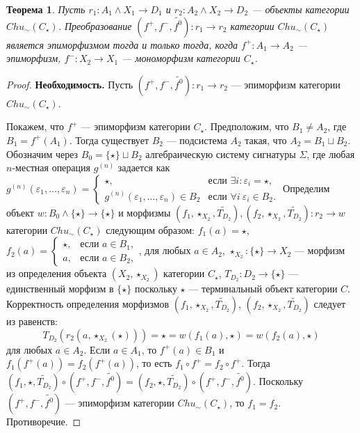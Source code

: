 \documentclass[a4paper,12pt]{article}
\newtheorem{theorem}{Теорема}
\newcommand{\fo}{\widetilde{f^0}}
\begin{document}
\begin{theorem}\label{epimorphism-c}
    Пусть $r_1: A_1 \wedge X_1 \to D_1$ и $r_2: A_2 \wedge X_2 \to D_2$ --- объекты категории $Chu_\sim(C_\star)$. Преобразование $(f^+,f^-,\fo): r_1 \to r_2$ категории $Chu_\sim(C_\star)$ является эпиморфизмом тогда и только тогда, когда $f^+: A_1 \to A_2$ --- эпиморфизм, $f^-: X_2 \to X_1$ --- мономорфизм категории $C_{\star}$.
\end{theorem}
\begin{proof}
    \textbf{Необходимость.} Пусть $(f^+,f^-,\fo): r_1 \to r_2$ --- эпиморфизм категории $Chu_\sim(C_\star)$.

    Покажем, что $f^+$ --- эпиморфизм категории $C_\star$. Предположим, что $B_1 \ne A_2$, где $B_1 = f^+(A_1)$. Тогда существует $B_2$ --- подсистема $A_2$ такая, что $A_2 = B_1 \sqcup B_2$. Обозначим через $B_0 = \{\star\} \sqcup B_2$ алгебраическую систему сигнатуры $\Sigma$, где любая $n$-местная операция $g^{(n)}$ задается как $g^{(n)}(\varepsilon_1,\ldots,\varepsilon_n) = 
    \begin{cases}
        \star, & \text{если } \exists i: \varepsilon_i = \star,\\
        g^{(n)}(\varepsilon_1,\ldots,\varepsilon_n) \in B_2 & \text{если } \forall i\ \varepsilon_i \in B_2.
    \end{cases}$ Определим объект $w: B_0 \wedge \{\star\} \to \{\star\}$ и морфизмы $(f_1,\star_{X_2},\widetilde{T_{D_2}}), (f_2,\star_{X_2},\widetilde{T_{D_2}}): r_2 \to w$ категории $Chu_\sim(C_\star)$ следующим образом: $f_1(a) = \star$, $f_2(a) = 
    \begin{cases}
        \star, & \text{если } a \in B_1,\\
        a, & \text{если } a \in B_2,
    \end{cases}$, для любых $a \in A_2$, $\star_{X_2}: \{\star\} \to X_2$ --- морфизм из определения объекта $(X_2,\star_{X_2})$ категории $C_\star$, $T_{D_2}: D_2 \to \{\star\}$ --- единственный морфизм в $\{\star\}$ поскольку $\star$ --- терминальный объект категории $C$. Корректность определения морфизмов $(f_1,\star_{X_2},\widetilde{T_{D_2}})$, $(f_2,\star_{X_2},\widetilde{T_{D_2}})$ следует из равенств:
    $$
        T_{D_2}(r_2(a,\star_{X_2}(\star))) = \star = w(f_1(a),\star) = w(f_2(a),\star)
    $$
    для любых $a \in A_2$. Если $a \in A_1$, то $f^+(a) \in B_1$ и $f_1(f^+(a)) = f_2(f^+(a))$, то есть $f_1 \circ f^+ = f_2 \circ f^+$. Тогда $(f_1,\star,\widetilde{T_{D_2}}) \circ (f^+,f^-,\fo) = (f_2,\star,\widetilde{T_{D_2}}) \circ (f^+,f^-,\fo)$. Поскольку $(f^+,f^-,\fo)$ --- эпиморфизм категории $Chu_\sim(C_\star)$, то $f_1 = f_2$. Противоречие.


\end{proof}
\end{document}
